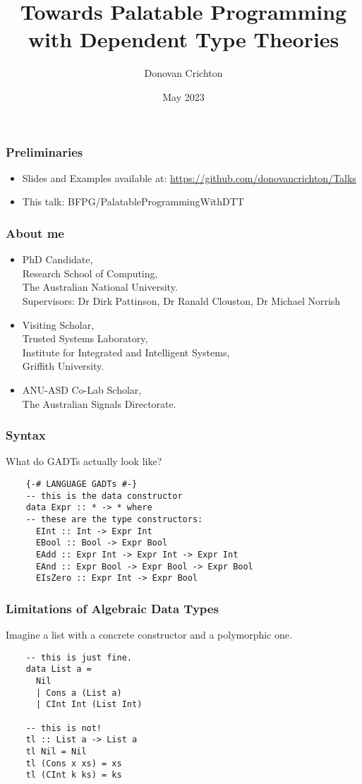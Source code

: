 \documentclass[hyperref={colorlinks = true,linkcolor = blue, citecolor = blue, urlcolor = blue}]{beamer}
\title{Towards Palatable Programming with Dependent Type Theories}
\author{Donovan Crichton}
\date{May 2023}
\begin{document}
 
\frame{\titlepage}

\begin{frame}[fragile]
  \frametitle{Preliminaries}
  \begin{itemize}
  \item Slides and Examples available at:
    \url{https://github.com/donovancrichton/Talks}
  \item This talk: BFPG/PalatableProgrammingWithDTT
  \end{itemize}
\end{frame}

\begin{frame}[fragile]
\frametitle{About me}
\begin{itemize}
  \item PhD Candidate, 
        \\ Research School of Computing, 
        \\ The Australian National University. \\
        \small{Supervisors: Dr Dirk Pattinson, Dr Ranald Clouston, 
               Dr Michael Norrish}
  \item Visiting Scholar, 
        \\ Trusted Systems Laboratory, 
        \\ Institute for Integrated and Intelligent Systems, 
        \\ Griffith University.
  \item ANU-ASD Co-Lab Scholar, 
        \\The Australian Signals Directorate.
\end{itemize}
\end{frame}

\begin{frame}[fragile]
  \frametitle{Syntax}
  What do GADTs actually look like?
  \begin{verbatim}
    {-# LANGUAGE GADTs #-}
    -- this is the data constructor
    data Expr :: * -> * where
    -- these are the type constructors:
      EInt :: Int -> Expr Int
      EBool :: Bool -> Expr Bool
      EAdd :: Expr Int -> Expr Int -> Expr Int
      EAnd :: Expr Bool -> Expr Bool -> Expr Bool
      EIsZero :: Expr Int -> Expr Bool
  \end{verbatim}
\end{frame}

\begin{frame}[fragile]
  \frametitle{Limitations of Algebraic Data Types}
  Imagine a list with a concrete constructor and a polymorphic one.
  \begin{verbatim}
    -- this is just fine.
    data List a =
      Nil
      | Cons a (List a)
      | CInt Int (List Int)

    -- this is not! 
    tl :: List a -> List a
    tl Nil = Nil
    tl (Cons x xs) = xs
    tl (CInt k ks) = ks
  \end{verbatim}
\end{frame}
\end{document}

